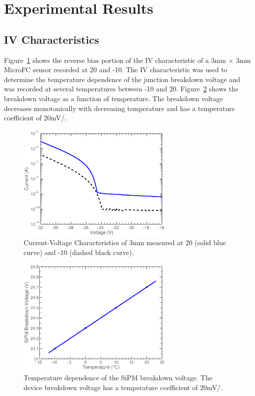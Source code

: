 \documentclass[journal]{IEEEtran}
\begin{document}
\section{Experimental Results}

\subsection{IV Characteristics}

Figure~\ref{fig:iv} shows the reverse bias portion of the IV characteristic of a 3mm $\times$ 3mm MicroFC sensor recorded at 20\celsius{} and -10\celsius{}. The IV characteristic was used to determine the temperature dependence of the junction breakdown voltage and was recorded at several temperatures between -10 and 20\celsius{}. Figure~\ref{fig:IVT} shows the  breakdown voltage as a function of temperature. The breakdown voltage decreases monotonically with decreasing temperature and has a temperature coefficient of 20mV/\celsius{}. 

\begin{figure}[tb]
\centering
\includegraphics[width=3in]{fig1_IV.eps}
\caption{Current-Voltage Characteristics of 3mm  measured at 20\celsius{} (solid blue curve) and -10\celsius{} (dashed black curve).}
\label{fig:iv}
\end{figure}

\begin{figure}[tb]
\centering
\includegraphics[width=3in]{vbr_temp_depend.eps}
\caption{Temperature dependence of the SiPM breakdown voltage. The device breakdown voltage has a temperature coefficient of 20mV/\celsius{}.}
\label{fig:IVT}
\end{figure}
\end{document}
